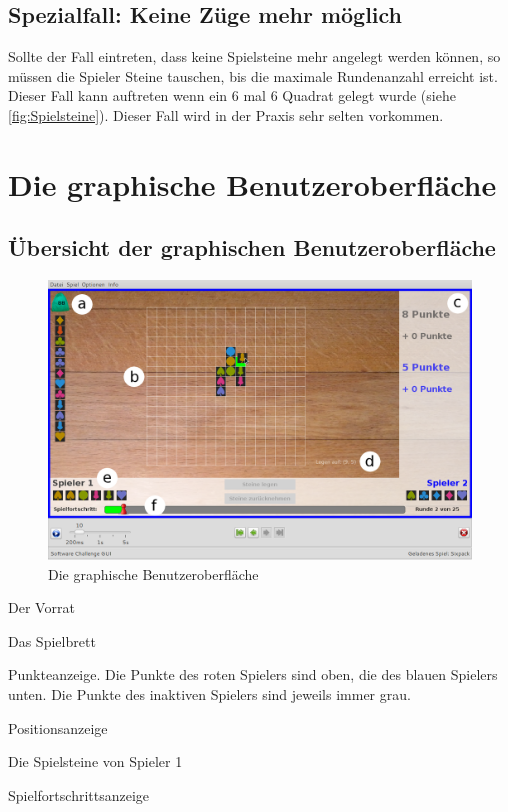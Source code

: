 \documentclass[a4paper, ngerman]{scrartcl}
\begin{document}
\subsection{Spezialfall: Keine Züge mehr möglich}
Sollte der Fall eintreten, dass keine Spielsteine mehr angelegt werden können, so müssen die Spieler Steine tauschen, bis die maximale Rundenanzahl erreicht ist. Dieser Fall kann auftreten wenn ein 6 mal 6 Quadrat gelegt wurde (siehe \autoref{fig:Spielsteine}). Dieser Fall wird in der Praxis sehr selten vorkommen.
\newpage
	
\section{Die graphische Benutzeroberfläche}
\subsection{Übersicht der graphischen Benutzeroberfläche}
\begin{figure}[h]
	\centering
	\includegraphics[width = \textwidth]{images/GUI}
	\caption{Die graphische Benutzeroberfläche}
\end{figure}
\begin{compactenum}[a)]
	\item Der Vorrat
	\item Das Spielbrett
	\item Punkteanzeige. Die Punkte des roten Spielers sind
	oben, die des blauen Spielers unten. Die Punkte des inaktiven Spielers sind
	jeweils immer grau.
	\item Positionsanzeige
	\item Die Spielsteine von Spieler 1
	\item Spielfortschrittsanzeige
\end{compactenum}
	
\end{document}
